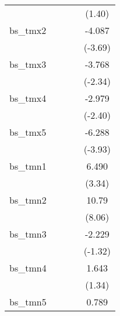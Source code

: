 \begin{tabular}{l*{4}{c}}
            &                     &                     &                     &      (1.40)         \\
[1em]
bs\_tmx2     &                     &                     &                     &      -4.087\sym{***}\\
            &                     &                     &                     &     (-3.69)         \\
[1em]
bs\_tmx3     &                     &                     &                     &      -3.768\sym{*}  \\
            &                     &                     &                     &     (-2.34)         \\
[1em]
bs\_tmx4     &                     &                     &                     &      -2.979\sym{*}  \\
            &                     &                     &                     &     (-2.40)         \\
[1em]
bs\_tmx5     &                     &                     &                     &      -6.288\sym{***}\\
            &                     &                     &                     &     (-3.93)         \\
[1em]
bs\_tmn1     &                     &                     &                     &       6.490\sym{***}\\
            &                     &                     &                     &      (3.34)         \\
[1em]
bs\_tmn2     &                     &                     &                     &       10.79\sym{***}\\
            &                     &                     &                     &      (8.06)         \\
[1em]
bs\_tmn3     &                     &                     &                     &      -2.229         \\
            &                     &                     &                     &     (-1.32)         \\
[1em]
bs\_tmn4     &                     &                     &                     &       1.643         \\
            &                     &                     &                     &      (1.34)         \\
[1em]
bs\_tmn5     &                     &                     &                     &       0.789         \\

\end{tabular}
